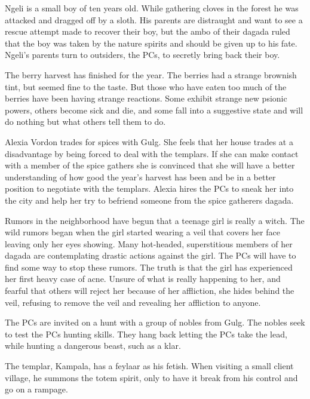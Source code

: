 {
	\item Ngeli is a small boy of ten years old. While gathering cloves in the forest he was attacked and dragged off by a sloth. His parents are distraught and want to see a rescue attempt made to recover their boy, but the ambo of their dagada ruled that the boy was taken by the nature spirits and should be given up to his fate. Ngeli's parents turn to outsiders, the PCs, to secretly bring back their boy.
	\item The berry harvest has finished for the year. The berries had a strange brownish tint, but seemed fine to the taste. But those who have eaten too much of the berries have been having strange reactions. Some exhibit strange new psionic powers, others become sick and die, and some fall into a suggestive state and will do nothing but what others tell them to do.
	\item Alexia Vordon trades for spices with Gulg. She feels that her house trades at a disadvantage by being forced to deal with the templars. If she can make contact with a member of the spice gathers she is convinced that she will have a better understanding of how good the year's harvest has been and be in a better position to negotiate with the templars. Alexia hires the PCs to sneak her into the city and help her try to befriend someone from the spice gatherers dagada.
	\item Rumors in the neighborhood have begun that a teenage girl is really a witch. The wild rumors began when the girl started wearing a veil that covers her face leaving only her eyes showing. Many hot-headed, superstitious members of her dagada are contemplating drastic actions against the girl. The PCs will have to find some way to stop these rumors. The truth is that the girl has experienced her first heavy case of acne. Unsure of what is really happening to her, and fearful that others will reject her because of her affliction, she hides behind the veil, refusing to remove the veil and revealing her affliction to anyone.
	\item The PCs are invited on a hunt with a group of nobles from Gulg. The nobles seek to test the PCs hunting skills. They hang back letting the PCs take the lead, while hunting a dangerous beast, such as a klar.
	\item The templar, Kampala, has a feylaar as his fetish. When visiting a small client village, he summons the totem spirit, only to have it break from his control and go on a rampage.
}